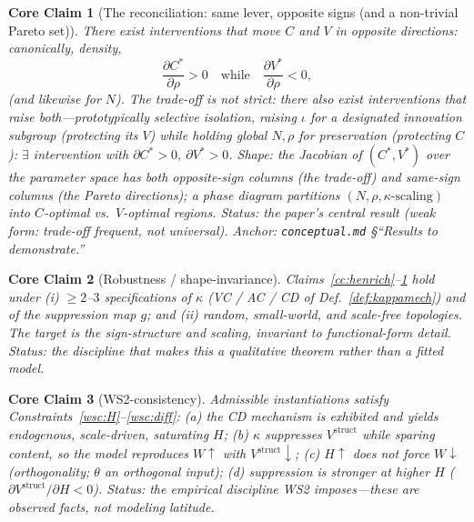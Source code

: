 \documentclass[11pt,letterpaper]{article}
\theoremstyle{definition}
\theoremstyle{plain}
\newtheorem{coreclaim}{Core Claim}
\begin{document}
\begin{coreclaim}[The reconciliation: same lever, opposite signs (and a non-trivial Pareto set)]\label{cc:reconcile}
There exist interventions that move $C$ and $V$ in \emph{opposite} directions:
canonically, density,
\[
  \frac{\partial C^\ast}{\partial \rho} > 0
  \quad\text{while}\quad
  \frac{\partial V^\ast}{\partial \rho} < 0,
\]
(and likewise for $N$). The trade-off is \emph{not strict}: there also exist
interventions that raise \emph{both}---prototypically \emph{selective isolation},
raising $\iota$ for a designated innovation subgroup (protecting its $V$) while
holding global $N,\rho$ for preservation (protecting $C$):
$\exists$ intervention with $\partial C^\ast>0,\ \partial V^\ast>0$.
\emph{Shape:} the Jacobian of $(C^\ast,V^\ast)$ over the parameter space has both
opposite-sign columns (the trade-off) and same-sign columns (the Pareto
directions); a \emph{phase diagram} partitions $(N,\rho,\kappa\text{-scaling})$
into $C$-optimal vs.\ $V$-optimal regions. \emph{Status:} the paper's central
result (weak form: trade-off frequent, not universal). \emph{Anchor:}
\texttt{conceptual.md} \S``Results to demonstrate.''
\end{coreclaim}

\begin{coreclaim}[Robustness / shape-invariance]\label{cc:robust}
Claims~\ref{cc:henrich}--\ref{cc:reconcile} hold under (i) $\ge\!2$--$3$
specifications of $\kappa$ (VC / AC / CD of Def.~\ref{def:kappamech}) and of the
suppression map $g$; and (ii) random, small-world, and scale-free topologies. The
target is the \emph{sign-structure and scaling}, invariant to functional-form
detail. \emph{Status:} the discipline that makes this a qualitative theorem
rather than a fitted model.
\end{coreclaim}

\begin{coreclaim}[WS2-consistency]\label{cc:ws2}
Admissible instantiations satisfy Constraints~\ref{wsc:H}--\ref{wsc:diff}: (a) the
CD mechanism is exhibited and yields \emph{endogenous, scale-driven, saturating}
$H$; (b) $\kappa$ suppresses $V^{\mathrm{struct}}$ while sparing content, so the
model reproduces $W\!\uparrow$ with $V^{\mathrm{struct}}\!\downarrow$; (c)
$H\!\uparrow$ does not force $W\!\downarrow$ (orthogonality; $\theta$ an
orthogonal input); (d) suppression is stronger at higher $H$
($\partial V^{\mathrm{struct}}/\partial H<0$). \emph{Status:} the empirical
discipline WS2 imposes---these are observed facts, not modeling latitude.
\end{coreclaim}
\end{document}

